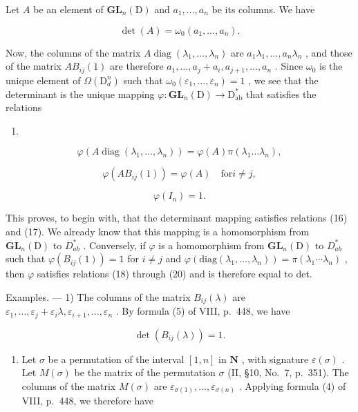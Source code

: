 Let \(A\) be an element of \(\mathbf{GL}_n(\mathrm{D})\) and \(a_1, \ldots, a_n\) be its columns. We have

\[
\det (A) = \omega_ {0} (a _ {1}, \dots , a _ {n}).
\]

Now, the columns of the matrix \(A \operatorname{diag}(\lambda_1, \ldots, \lambda_n)\) are \(a_1\lambda_1, \ldots, a_n\lambda_n\) , and those of the matrix \(AB_{ij}(1)\) are therefore \(a_1, \ldots, a_j + a_i, a_{j+1}, \ldots, a_n\) . Since \(\omega_0\) is the unique element of \(\Omega(\mathrm{D}_d^n)\) such that \(\omega_0(\varepsilon_1, \ldots, \varepsilon_n) = 1\) , we see that the determinant is the unique mapping \(\varphi: \mathbf{GL}_n(\mathrm{D}) \to \mathrm{D}_{\mathrm{ab}}^*\) that satisfies the relations

\begin{enumerate}
\def\labelenumi{(\arabic{enumi})}
\setcounter{enumi}{17}
\tightlist
\item
\end{enumerate}

\[
\varphi (A \operatorname{diag} (\lambda_ {1}, \ldots , \lambda_ {n})) = \varphi (A) \pi (\lambda_ {1} \dots \lambda_ {n}),\tag{19}
\]

\[
\varphi (A B _ {i j} (1)) = \varphi (A) \quad \mathrm{for} i \neq j,\tag{20}
\]

\[
\varphi (I _ {n}) = 1.
\]

This proves, to begin with, that the determinant mapping satisfies relations (16) and (17). We already know that this mapping is a homomorphism from \(\mathbf{GL}_{n}(\mathrm{D})\) to \(D_{ab}^{*}\) . Conversely, if \(\varphi\) is a homomorphism from \(\mathbf{GL}_{n}(\mathrm{D})\) to \(D_{ab}^{*}\) such that \(\varphi(B_{ij}(1)) = 1\) for \(i \neq j\) and \(\varphi(\text{diag}(\lambda_1, \ldots, \lambda_n)) = \pi(\lambda_1 \cdots \lambda_n)\) , then \(\varphi\) satisfies relations (18) through (20) and is therefore equal to det.

Examples. --- 1) The columns of the matrix \(B_{ij}(\lambda)\) are \(\varepsilon_1, \ldots, \varepsilon_j + \varepsilon_i \lambda, \varepsilon_{i+1}, \ldots, \varepsilon_n\) . By formula (5) of VIII, p.~448, we have

\[
\det (B _ {i j} (\lambda)) = 1.\tag{21}
\]

\begin{enumerate}
\def\labelenumi{\arabic{enumi})}
\setcounter{enumi}{1}
\tightlist
\item
  Let \(\sigma\) be a permutation of the interval \([1,n]\) in \(\mathbf{N}\) , with signature \(\varepsilon(\sigma)\) . Let \(M(\sigma)\) be the matrix of the permutation \(\sigma\) (II, §10, No.~7, p.~351). The columns of the matrix \(M(\sigma)\) are \(\varepsilon_{\sigma(1)},\ldots,\varepsilon_{\sigma(n)}\) . Applying formula (4) of VIII, p.~448, we therefore have
\end{enumerate}

